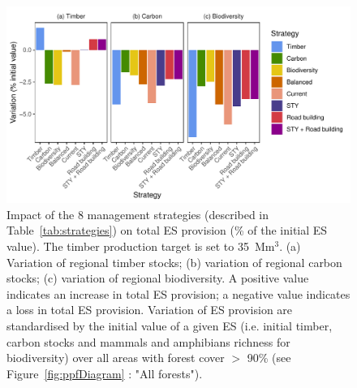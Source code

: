\documentclass{article}
\begin{document}
\begin{figure}
    \centering
    \includegraphics[width=\linewidth]{graphs/costsScenario}
    \caption{Impact of the 8 management strategies (described in Table~\ref{tab:strategies}) on total ES provision (\% of the initial ES value). The timber production target is set to 35~Mm$^3$. (a) Variation of regional timber stocks; (b) variation of regional carbon stocks; (c) variation of regional biodiversity. A positive value indicates an increase in total ES provision; a negative value indicates a loss in total ES provision. Variation of ES provision are standardised by the initial value of a given ES (i.e. initial timber, carbon stocks and mammals and amphibians richness for biodiversity) over all areas with forest cover $>$ 90\% (see Figure~\ref{fig:ppfDiagram} : "All forests"). }
    \label{fig:scenESProv}
\end{figure}
\end{document}
